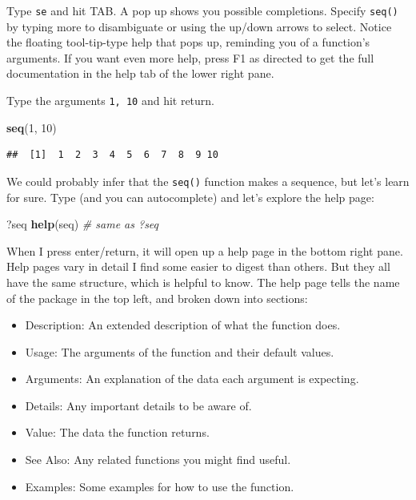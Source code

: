\documentclass[]{book}
\newenvironment{Shaded}{\begin{snugshade}}{\end{snugshade}}
\newcommand{\CommentTok}[1]{\textcolor[rgb]{0.56,0.35,0.01}{\textit{#1}}}
\newcommand{\DecValTok}[1]{\textcolor[rgb]{0.00,0.00,0.81}{#1}}
\newcommand{\KeywordTok}[1]{\textcolor[rgb]{0.13,0.29,0.53}{\textbf{#1}}}
\newcommand{\NormalTok}[1]{#1}
\providecommand{\tightlist}{%
  \setlength{\itemsep}{0pt}\setlength{\parskip}{0pt}}
\begin{document}
Type \texttt{se} and hit TAB. A pop up shows you possible completions. Specify \texttt{seq()} by typing more to disambiguate or using the up/down arrows to select. Notice the floating tool-tip-type help that pops up, reminding you of a function's arguments. If you want even more help, press F1 as directed to get the full documentation in the help tab of the lower right pane.

Type the arguments \texttt{1,\ 10} and hit return.

\begin{Shaded}
\begin{Highlighting}[]
\KeywordTok{seq}\NormalTok{(}\DecValTok{1}\NormalTok{, }\DecValTok{10}\NormalTok{)}
\end{Highlighting}
\end{Shaded}

\begin{verbatim}
##  [1]  1  2  3  4  5  6  7  8  9 10
\end{verbatim}

We could probably infer that the \texttt{seq()} function makes a sequence, but let's learn for sure. Type (and you can autocomplete) and let's explore the help page:

\begin{Shaded}
\begin{Highlighting}[]
\NormalTok{?seq }
\KeywordTok{help}\NormalTok{(seq) }\CommentTok{# same as ?seq}
\end{Highlighting}
\end{Shaded}

When I press enter/return, it will open up a help page in the bottom right pane. Help pages vary in detail I find some easier to digest than others. But they all have the same structure, which is helpful to know. The help page tells the name of the package in the top left, and broken down into sections:

\begin{itemize}
\tightlist
\item
  Description: An extended description of what the function does.
\item
  Usage: The arguments of the function and their default values.
\item
  Arguments: An explanation of the data each argument is expecting.
\item
  Details: Any important details to be aware of.
\item
  Value: The data the function returns.
\item
  See Also: Any related functions you might find useful.
\item
  Examples: Some examples for how to use the function.
\end{itemize}
\end{document}
